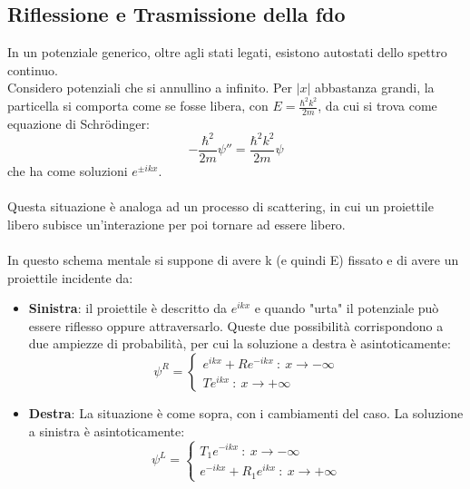 \documentclass[twoside]{article}
\begin{document}
\vspace{0.5cm}

\subsection{Riflessione e Trasmissione della fdo}
In un potenziale generico, oltre agli stati legati, esistono autostati dello spettro continuo.
\\
Considero potenziali che si annullino a infinito. 
Per $|x|$ abbastanza grandi, la particella si comporta come se fosse libera, con $E=\frac{\hbar ^2 k^2}{2m}$, da cui si trova come equazione di Schr\"odinger:
\begin{equation}
    -\frac{\hbar^2}{2m}\psi''=\frac{\hbar ^2 k^2}{2m}\psi
\end{equation}
che ha come soluzioni $e^{\pm ikx}$.
\\ \\
Questa situazione è analoga ad un processo di scattering, in cui un proiettile libero subisce un'interazione per poi tornare ad essere libero.
\\ \\
In questo schema mentale si suppone di avere k (e quindi E) fissato e di avere un proiettile incidente da:
\begin{itemize}
    \item \textbf{Sinistra}: il proiettile è descritto da $e^{ikx}$ e quando "urta" il potenziale può essere riflesso oppure attraversarlo.
    Queste due possibilità corrispondono a due ampiezze di probabilità, per cui la soluzione a destra è asintoticamente:
    \begin{equation}
       \psi^R = \left \{ \begin{array}{rl}
            e^{ikx}+Re^{-ikx} \ : \ x \rightarrow -\infty\\
         Te^{ikx} \ : \ x \rightarrow +\infty
        \end{array}
    \right. 
    \end{equation}
    \item\textbf{Destra}: La situazione è come sopra, con i cambiamenti del caso. La soluzione a sinistra è asintoticamente:
    \begin{equation}
        \psi^L =\left \{ \begin{array}{rl}
            T_1 e^{-ikx} \ : \ x \rightarrow -\infty\\
         e^{-ikx}+R_1 e^{ikx} \ : \ x \rightarrow +\infty
        \end{array}
    \right.
    \end{equation}
\end{itemize}
\end{document}
